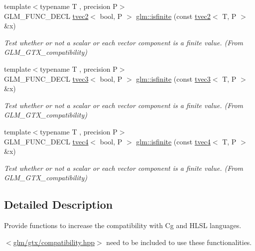\begin{DoxyCompactItemize}
\mbox{\label{group__gtx__compatibility_ga7dd492aa7d6ec21715f9a91b6e5e596a}} 
{\footnotesize template$<$typename T , precision P$>$ }\\G\+L\+M\+\_\+\+F\+U\+N\+C\+\_\+\+D\+E\+CL \hyperlink{structglm_1_1tvec2}{tvec2}$<$ bool, P $>$ \hyperlink{group__gtx__compatibility_ga7dd492aa7d6ec21715f9a91b6e5e596a}{glm\+::isfinite} (const \hyperlink{structglm_1_1tvec2}{tvec2}$<$ T, P $>$ \&x)
\begin{DoxyCompactList}\small\item\em Test whether or not a scalar or each vector component is a finite value. (From G\+L\+M\+\_\+\+G\+T\+X\+\_\+compatibility) \end{DoxyCompactList}\item 
\mbox{\label{group__gtx__compatibility_ga1be9593d810fceb278a2854da8a25273}} 
{\footnotesize template$<$typename T , precision P$>$ }\\G\+L\+M\+\_\+\+F\+U\+N\+C\+\_\+\+D\+E\+CL \hyperlink{structglm_1_1tvec3}{tvec3}$<$ bool, P $>$ \hyperlink{group__gtx__compatibility_ga1be9593d810fceb278a2854da8a25273}{glm\+::isfinite} (const \hyperlink{structglm_1_1tvec3}{tvec3}$<$ T, P $>$ \&x)
\begin{DoxyCompactList}\small\item\em Test whether or not a scalar or each vector component is a finite value. (From G\+L\+M\+\_\+\+G\+T\+X\+\_\+compatibility) \end{DoxyCompactList}\item 
\mbox{\label{group__gtx__compatibility_ga8c6a59e2f2ac84fba0c5932f1c35bf7a}} 
{\footnotesize template$<$typename T , precision P$>$ }\\G\+L\+M\+\_\+\+F\+U\+N\+C\+\_\+\+D\+E\+CL \hyperlink{structglm_1_1tvec4}{tvec4}$<$ bool, P $>$ \hyperlink{group__gtx__compatibility_ga8c6a59e2f2ac84fba0c5932f1c35bf7a}{glm\+::isfinite} (const \hyperlink{structglm_1_1tvec4}{tvec4}$<$ T, P $>$ \&x)
\begin{DoxyCompactList}\small\item\em Test whether or not a scalar or each vector component is a finite value. (From G\+L\+M\+\_\+\+G\+T\+X\+\_\+compatibility) \end{DoxyCompactList}\end{DoxyCompactItemize}


\subsection{Detailed Description}
Provide functions to increase the compatibility with Cg and H\+L\+SL languages. 

$<$\hyperlink{compatibility_8hpp}{glm/gtx/compatibility.\+hpp}$>$ need to be included to use these functionalities. 
